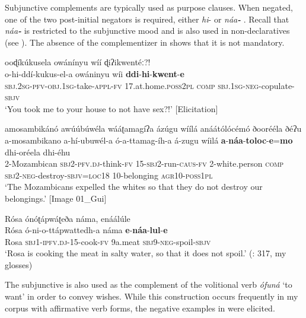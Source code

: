 \documentclass[output=paper,colorlinks=true, citecolor=brown,draftmode]{langscibook}
\begin{document}
Subjunctive complements are typically used as purpose clauses. When negated, one of the two post-initial negators is required, either \textit{hi}{}-  or \textit{náa}\textbf{\textit{{}-}} . Recall that \textit{náa}\textbf{\textit{{}-}} is restricted to the subjunctive mood and is also used in non-declaratives (see ). The absence of the complementizer in  shows that it is not mandatory.

{\ea\label{ex:cuw:35} ooɖíkúkusela owánínyu wíí ɖiʔikwentéː?!\\
    \gll o-hi-ddí-kukus-el-a owáninyu wíi \textbf{ddi}{}-\textbf{hi}{}-\textbf{kwent}{}-\textbf{e} \\
         \textsc{sbj.2sg-pfv-obj.1sg}{}-take\textsc{{}-appl-fv} 17.at.home.\textsc{poss2pl} \textsc{comp} \textsc{sbj.1sg-neg}{}-copulate-\textsc{sbjv} \\
    \glt ‘You took me to your house to not have sex?!’ [Elicitation]
\z }

\ea\label{ex:cuw:36}
    \ea\label{ex:cuw:36a} amosambikánó awúúbúwéla wááʈamagíʔa ázúgu wíílá anáátólócémó ðoorééla ðéʔu\\
        \gll  a-mosambikano a-hí-ubuwél-a ó-a-ttamag-íh-a á-zugu wíilá \textbf{a}{}-\textbf{náa}{}-\textbf{toloc}{}-\textbf{e}=\textbf{mo} dhi-oréela dhi-éhu \\
              2-Mozambican \textsc{sbj2-pfv.dj-}think-\textsc{fv} \textsc{15-sbj2-}run\textsc{{}-caus-fv} 2-white.person \textsc{comp} \textsc{sbj2-neg}{}-destroy-\textsc{sbjv=loc18} \textsc{10-}belonging \textsc{agr10-poss1pl} \\
        \glt ‘The Mozambicans expelled the whites so that they do not destroy our belongings.’ [Image 01\_Gui]

    \ex\label{ex:cuw:36b} Rósa ónóʈápwáʈeða náma, enáálúle\\
        \gll  Rósa ó-ni-o-ttápwattedh-a náma \textbf{e}{}-\textbf{náa}{}-\textbf{lul}{}-\textbf{e} \\
              Rosa \textsc{sbj1-ipfv.dj-15-}cook-\textsc{fv} 9a.meat \textsc{sbj9}{}-\textsc{neg-}spoil\textsc{{}-sbjv} \\
        \glt  ‘Rosa is cooking the meat in salty water, so that it does not spoil.’ (\citealt{FestiValler1994}: 317, my glosses)
    \z
\z 

The subjunctive is also used as the complement of the volitional verb \textit{ófuná} ‘to want’ in order to convey wishes. While this construction occurs frequently in my corpus with affirmative verb forms, the negative examples in  were elicited.
\end{document}
